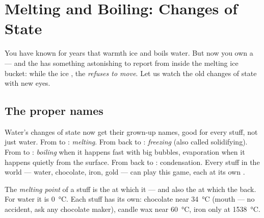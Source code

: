 \chapter{Melting and Boiling: Changes of State}\label{ch:g4:changes-of-state}

You have known for years that warmth  ice and boils water. But
now you own a  --- and the  has something
astonishing to report from inside the melting ice bucket: while the
ice , the  \emph{refuses to move}. Let us watch the
old changes of state with new eyes.

\section{The proper names}

Water's changes of state now get their grown-up names, good for
every stuff, not just water. From  to :
\emph{melting}. From  back to :
\emph{freezing} (also called solidifying). From
 to : \emph{boiling} when it happens fast
with big bubbles, evaporation when it happens quietly from the
surface. From  back to : condensation. Every stuff in the
world --- water, chocolate, iron, gold --- can play this game, each
at its own .

\begin{definition}\label{def:g4:changes-of-state:melting-point}
The \emph{melting point} of a stuff is the
 at which it  --- and also the  at which
the   back. For water it is \qty{0}{\celsius}. Each
stuff has its own: chocolate  near \qty{34}{\celsius} (mouth
 --- no accident, ask any chocolate maker), candle wax
near \qty{60}{\celsius}, iron only at \qty{1538}{\celsius}.
\end{definition}

